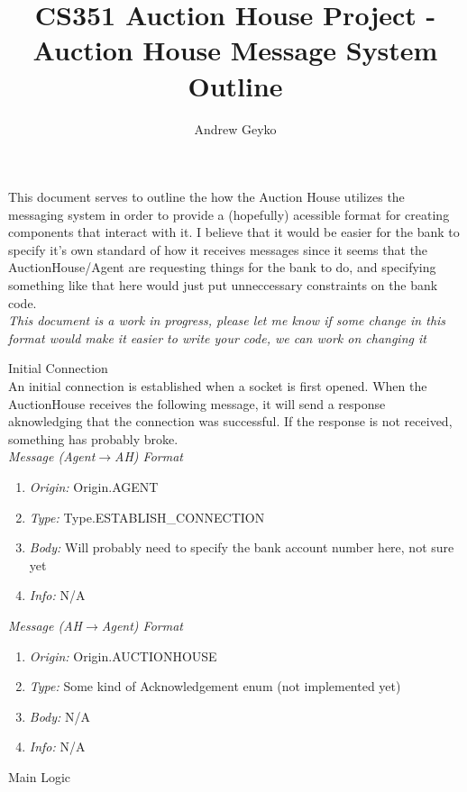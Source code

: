 \documentclass{article}
\title{CS351 Auction House Project - Auction House Message System Outline}
\author{Andrew Geyko}
\date{}
\begin{document}
\normalsize
\maketitle 
This document serves to outline the how the Auction House utilizes the messaging system in order to provide a (hopefully) acessible format for creating components that interact with it. I believe that it would be easier for the bank to specify it's own standard of how it receives messages since it seems that the AuctionHouse/Agent are requesting things for the bank to do, and specifying something like that here would just put unneccessary constraints on the bank code. 
\vspace{0.5cm}
\\\emph{This document is a work in progress, please let me know if some change in this format would make it easier to write your code, we can work on changing it}

\vspace{3cm} 

\huge 
Initial Connection 
\normalsize
\\An initial connection is established when a socket is first opened. When the AuctionHouse receives the following message, it will send a response aknowledging that the connection was successful. If the response is not received, something has probably broke.
\footnotesize 
\\\emph{Message (Agent$\to$AH) Format} 
\begin{enumerate}
	\item[]\emph{Origin:} Origin.AGENT
	\item[]\emph{Type: } Type.ESTABLISH\_CONNECTION 
	\item[]\emph{Body: } Will probably need to specify the bank account number here, not sure yet
	\item[]\emph{Info: } N/A 
\end{enumerate}
\emph{Message (AH$\to$Agent) Format} 
\begin{enumerate}
	\item[]\emph{Origin:} Origin.AUCTIONHOUSE 
	\item[]\emph{Type: } Some kind of Acknowledgement enum (not implemented yet) 
	\item[]\emph{Body: } N/A 
	\item[]\emph{Info: } N/A 
\end{enumerate}
\clearpage
\huge
Main Logic 

\vspace{1cm}
\end{document}
